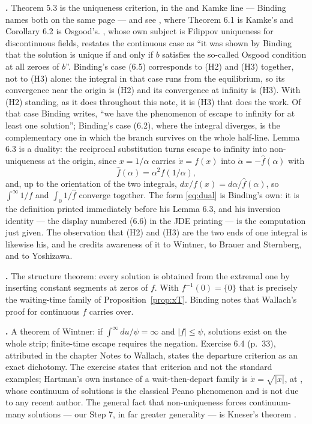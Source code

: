 \documentclass[12pt]{article}
\theoremstyle{plain}
\theoremstyle{definition}
\theoremstyle{remark}
\begin{document}
\textbf{\citet[\S\S5--6, pp.~190--193]{Binding}.} Theorem 5.3 is the
uniqueness criterion, in the \citet{Osgood} and Kamke line --- Binding
names both on the same page --- and see \citet[ch.~III \S6]{Hartman},
where Theorem 6.1 is Kamke's and Corollary 6.2 is Osgood's. \citet{Fjordholm}, whose own subject is Filippov uniqueness for discontinuous
fields, restates the continuous case as ``it was shown by Binding that the
solution is unique if and only if $b$ satisfies the so-called Osgood condition
at all zeroes of $b$''. Binding's case (6.5) corresponds to (H2) and (H3)
together,
not to (H3) alone: the integral in that case runs from the equilibrium, so its
convergence near the origin is (H2) and its convergence at infinity is (H3).
With (H2) standing, as it does throughout this note, it is (H3) that does the
work. Of that case Binding writes, ``we have the phenomenon of escape to
infinity for at least one solution''; Binding's case (6.2), where the integral
diverges, is the complementary one in which the branch survives on the whole
half-line. Lemma 6.3
is a duality: the reciprocal substitution turns escape to infinity into
non-uniqueness at the origin, since $x=1/\alpha$ carries $\dot x=f(x)$ into
$\dot\alpha=-\hat f(\alpha)$ with
\begin{equation}\label{eq:dual}
  \hat f(\alpha)=\alpha^{2}f(1/\alpha),
\end{equation}
and, up to the orientation of the two integrals, $dx/f(x)=d\alpha/\hat
f(\alpha)$, so $\int^{\infty}1/f$ and $\int_{0}1/\hat f$ converge together. The
form \eqref{eq:dual} is Binding's own: it is the definition printed immediately
before his Lemma 6.3, and his inversion identity --- the display numbered (6.6)
in the JDE printing --- is the computation just given.
The observation that (H2) and (H3) are the two ends of one integral is likewise
his, and he credits awareness of it to Wintner, to Brauer and Sternberg, and to
Yoshizawa.

\textbf{\citet[Lemma 7.5, p.~194]{Binding}.} The structure theorem: every
solution is obtained from the extremal one by inserting constant segments at
zeros of $f$. With $f^{-1}(0)=\{0\}$ that is precisely the waiting-time family
of Proposition~\ref{prop:xT}. Binding notes that Wallach's proof for continuous
$f$ carries over.

\textbf{\citet[ch.~III \S5 Thm.~5.1, p.~30]{Hartman}.} A theorem of
Wintner: if $\int^{\infty}du/\psi=\infty$ and $|f|\le\psi$, solutions exist on
the whole strip; finite-time escape requires the negation. Exercise 6.4 (p.~33),
attributed in the chapter Notes to Wallach, states the departure criterion as an
exact dichotomy. The exercise states that criterion and not the standard
examples; Hartman's own instance of a wait-then-depart family is
$\dot x=\sqrt{|x|}$, at \citep[][ch.~I \S1, eq.~(1.5), p.~2]{Hartman}, whose
continuum of solutions is the classical Peano phenomenon and is not due to any
recent author. The general fact that non-uniqueness forces continuum-many
solutions --- our Step 7, in far greater generality --- is Kneser's theorem
\citep[][ch.~II \S4 Thm.~4.1]{Hartman}.
\end{document}

